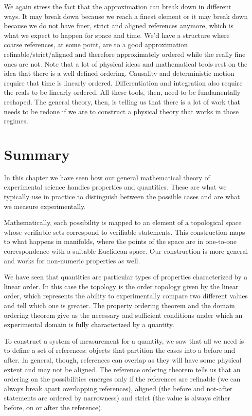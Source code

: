 \documentclass[11pt,letterpaper,fleqn]{memoir} %
\begin{document}
We again stress the fact that the approximation can break down in different ways. It may break down because we reach a finest element or it may break down because we do not have finer, strict and aligned references anymore, which is what we expect to happen for space and time. We'd have a structure where coarse references, at some point, are to a good approximation refinable/strict/aligned and therefore approximately ordered while the really fine ones are not. Note that a lot of physical ideas and mathematical tools rest on the idea that there is a well defined ordering. Causality and deterministic motion require that time is linearly ordered. Differentiation and integration also require the reals to be linearly ordered. All these tools, then, need to be fundamentally reshaped. The general theory, then, is telling us that there is a lot of work that needs to be redone if we are to construct a physical theory that works in those regimes.


\section{Summary}

In this chapter we have seen how our general mathematical theory of experimental science handles properties and quantities. These are what we typically use in practice to distinguish between the possible cases and are what we measure experimentally.

Mathematically, each possibility is mapped to an element of a topological space whose verifiable sets correspond to verifiable statements. This construction maps to what happens in manifolds, where the points of the space are in one-to-one correspondence with a suitable Euclidean space. Our construction is more general and works for non-numeric properties as well.

We have seen that quantities are particular types of properties characterized by a linear order. In this case the topology is the order topology given by the linear order, which represents the ability to experimentally compare two different values and tell which one is greater. The property ordering theorem and the domain ordering theorem give us the necessary and sufficient conditions under which an experimental domain is fully characterized by a quantity.

To construct a system of measurement for a quantity, we saw that all we need is to define a set of references: objects that partition the cases into a before and after. In general, though, references can overlap as they will have some physical extent and may not be aligned. The reference ordering theorem tells us that an ordering on the possibilities emerges only if the references are refinable (we can always break apart overlapping references), aligned (the before and not-after statements are ordered by narrowness) and strict (the value is always either before, on or after the reference).
\end{document}
